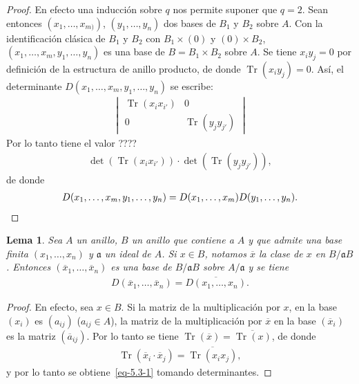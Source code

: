 \documentclass[oneside,bibtotoc,leqno,spanish]{amsbook}
\newcommand{\idl}[1]{\mathfrak{#1}}
\newcommand{\QED}{}%
\newcommand{\oline}[1]{\overline{#1}}
\DeclareMathOperator{\Tr}{Tr}
\numberwithin{equation}{section}
\theoremstyle{defi}
\theoremstyle{note}
\newtheorem{lemma}{Lema}
\theoremstyle{rem}
\numberwithin{theorem}{section}
\numberwithin{proposition}{section}
\numberwithin{definition}{section}
\numberwithin{lemma}{section}
\numberwithin{corollary}{section}
\numberwithin{example}{section}
\numberwithin{footnote}{section}%
\begin{document}
\begin{proof}
En efecto una inducci\'on sobre $q$ nos permite suponer que $q=2$. Sean entonces $(x_{1},\dots,x_{m)})$,
$(y_{1},\dots,y_{n})$ dos bases de $B_{1}$ y $B_{2}$ sobre $A$. Con la identificaci\'on cl\'asica de $B_{1}$ y
$B_{2}$ con $B_{1}\times(0)$ y $(0)\times B_{2}$, $(x_{1},\dots,x_{m},y_{1},\dots,y_{n})$ es una base de
$B = B_{1}\times B_{2}$ sobre $A$. Se tiene $x_{i}y_{j}=0$ por definici\'on de la estructura de anillo producto,
de donde $\Tr(x_{i}y_{j}) = 0$. As\'i, el determinante $D(x_{1},\dots,x_{m},y_{1},\dots,y_{n})$ se escribe:
\begin{gather*}
\begin{vmatrix}
\Tr(x_{i}x_{i'}) & 0\\
0 & \Tr(y_{j}y_{j'})
\end{vmatrix}
\end{gather*}
Por lo tanto tiene el valor ????
\begin{gather*}
\det(\Tr(x_{i}x_{i'}))\cdot\det(\Tr(y_{j}y_{j'})),
\end{gather*}
de donde
\begin{gather*}
D(x_{1},\dots,x_{m},y_{1},\dots,y_{n}) = D(x_{1},\dots,x_{m})D(y_{1},\dots,y_{n}).\qedhere%
\end{gather*}
\end{proof}

\begin{lemma}\label{lem5.3.2}
Sea $A$ un anillo, $B$ un anillo que contiene a $A$ y que admite una base finita $(x_{1},\dots,x_{n})$ y
$\idl{a}$ un ideal de $A$. Si $x\in B$, notamos $\oline x$ la clase de $x$ en $B/\idl{a}B$. Entonces
$(\oline x_{1},\dots,\oline x_{n})$ es una base de $B/\idl{a}B$ sobre $A/\idl{a}$ y se tiene
\begin{gather}\label{eq-5.3-1}
D(\oline x_{1},\dots,\oline x_{n}) = \oline{D(x_{1},\dots,x_{n})}.
\end{gather}
\end{lemma}

\begin{proof}
En efecto, sea $x\in B$. Si la matriz de la multiplicaci\'on por $x$, en la base $(x_{i})$ es $(a_{ij})$
($a_{ij}\in A$), la matriz de la multiplicaci\'on por $\oline x$ en la base $(\oline x_{i})$ es la matriz
$(\oline a_{ij})$. Por lo tanto se tiene $\Tr(\oline x) = \oline{\Tr(x)}$, de donde
\begin{gather*}
\Tr(\oline x_{i}\cdot\oline x_{j}) = \oline{\Tr(x_{i}x_{j})},
\end{gather*}
y por lo tanto se obtiene~\eqref{eq-5.3-1} tomando determinantes.
\end{proof}
\end{document}
